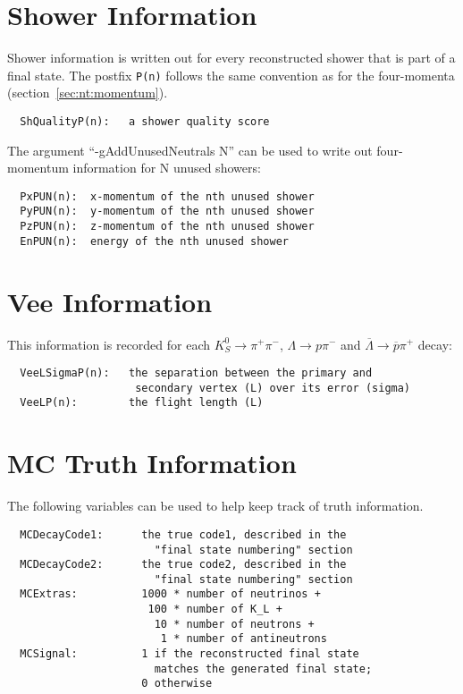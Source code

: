 \documentclass[11pt]{article}
\begin{document}
\section{Shower Information}
\label{sec:nt:shower}

Shower information is written out for every reconstructed shower that is part of a final state.  The postfix {\tt P(n)} follows the same convention as for the four-momenta (section~\ref{sec:nt:momentum}).
\begin{verbatim}
  ShQualityP(n):   a shower quality score
\end{verbatim}

The argument ``-gAddUnusedNeutrals N'' can be used to write out four-momentum information for N unused showers:
\begin{verbatim}
  PxPUN(n):  x-momentum of the nth unused shower
  PyPUN(n):  y-momentum of the nth unused shower
  PzPUN(n):  z-momentum of the nth unused shower
  EnPUN(n):  energy of the nth unused shower
\end{verbatim}


\section{Vee Information}
\label{sec:nt:vee}

This information is recorded for each $K^0_S\to\pi^+\pi^-$, $\Lambda \to p\pi^-$ and $\overline{\Lambda}\to\overline{p}\pi^+$ decay:
\begin{verbatim}
  VeeLSigmaP(n):   the separation between the primary and
                    secondary vertex (L) over its error (sigma)
  VeeLP(n):        the flight length (L)
\end{verbatim}

\section{MC Truth Information}
\label{sec:nt:truth}

The following variables can be used to help keep track of truth information.

\begin{verbatim}
  MCDecayCode1:      the true code1, described in the
                       "final state numbering" section
  MCDecayCode2:      the true code2, described in the
                       "final state numbering" section
  MCExtras:          1000 * number of neutrinos +
                      100 * number of K_L +
                       10 * number of neutrons +
                        1 * number of antineutrons
  MCSignal:          1 if the reconstructed final state
                       matches the generated final state;
                     0 otherwise
\end{verbatim}
\end{document}
